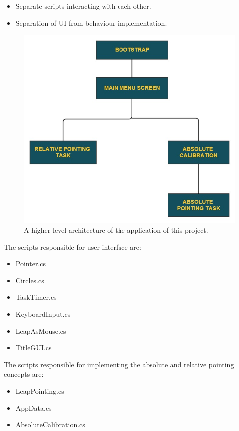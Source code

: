 \documentclass{article}
\begin{document}
\begin{itemize}
  \item Separate scripts interacting with each other.
  \item Separation of UI from behaviour implementation.
\end{itemize}

\begin{figure}[!h]
\centering
\includegraphics[width=4.5in]{Figure_6}
\caption{A higher level architecture of the application of this project.}
\end{figure}

The scripts responsible for user interface are:

\begin{itemize}
    \item Pointer.cs
    \item Circles.cs
    \item TaskTimer.cs
    \item KeyboardInput.cs
    \item LeapAsMouse.cs
    \item TitleGUI.cs
\end{itemize}

The scripts responsible for implementing the absolute and relative pointing concepts are:

\begin{itemize}
    \item LeapPointing.cs
    \item AppData.cs
    \item AbsoluteCalibration.cs

\end{itemize}
\end{document}
